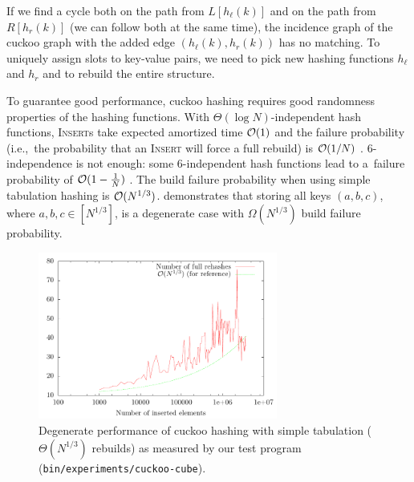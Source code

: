 If we find a cycle both on the path from $L[h_\ell(k)]$ and on the path from
$R[h_r(k)]$ (we can follow both at the same time), the incidence graph
of the cuckoo graph with the added edge $(h_\ell(k),h_r(k))$ has no matching.
To uniquely assign slots to key-value pairs, we need to pick new hashing
functions $h_\ell$ and $h_r$ and to rebuild the entire structure.

To guarantee good performance, cuckoo hashing requires good randomness
properties of the hashing functions.
With $\Theta(\log N)$-independent hash functions, \textsc{Insert}s take
expected amortized time $\mathcal{O}(1)$ and the failure probability (i.e.,\ the
probability that an \textsc{Insert} will force a full rebuild) is
$\mathcal{O}(1/N)$ \cite{cuckoo-hashing}.
\mbox{6-independence} is not enough: some \mbox{6-independent} hash functions
lead to a~failure probability of $\mathcal{O}(1-\frac{1}{N})$ \cite{cuckoo-hashing-indep-bounds}.
The build failure probability when using simple tabulation hashing is
$\mathcal{O}(N^{1/3})$. \cite{power-of-simple-tab} demonstrates that storing all keys
$(a,b,c)$, where $a,b,c\in[N^{1/3}]$, is a degenerate case with
$\Omega(N^{1/3})$ build failure probability.

\begin{figure}
	\centering
	\includegraphics[width=0.7\textwidth]{img/cuckoo/results}
	\caption{Degenerate performance of cuckoo hashing
		with simple tabulation ($\Theta(N^{1/3})$ rebuilds)
	as measured by our test program
(\texttt{bin/\allowbreak{}experiments/\allowbreak{}cuckoo-cube}).}
\end{figure}

